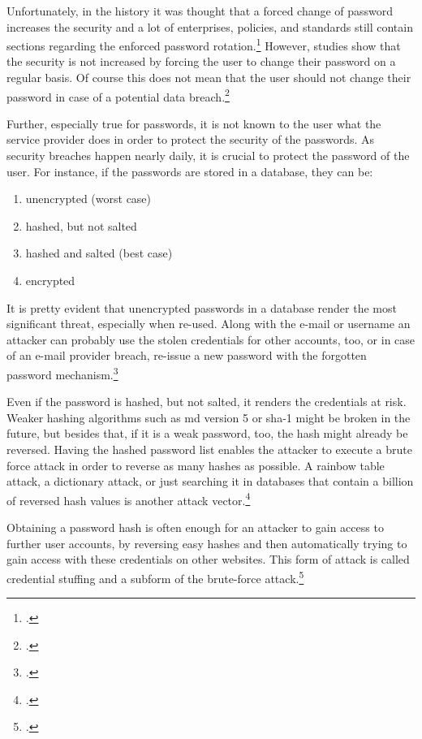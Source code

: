Unfortunately, in the history it was thought that a forced change of password increases the security and a lot of enterprises, policies, and standards still contain sections regarding the enforced password rotation.\footcites[See][1520]{deutschlandgrundschutz} However, studies show that the security is not increased by forcing the user to change their password on a regular basis. Of course this does not mean that the user should not change their password in case of a potential data breach.\footcites[See][14]{SP80063B}[See][]{7676198}[See][34]{anderson2008security}

Further, especially true for passwords, it is not known to the user what the service provider does in order to protect the security of the passwords. As security breaches happen nearly daily, it is crucial to protect the password of the user. For instance, if the passwords are stored in a database, they can be:

\begin{enumerate}[label=(\alph*)]
	\item unencrypted (worst case)
	\item hashed, but not salted
	\item hashed and salted (best case)
	\item encrypted
\end{enumerate}

It is pretty evident that unencrypted passwords in a database render the most significant threat, especially when re-used. Along with the e-mail or username an attacker can probably use the stolen credentials for other accounts, too, or in case of an e-mail provider breach, re-issue a new password with the \frqq forgotten password\flqq{} mechanism.\footcite[See][277]{shostack2014threat}

Even if the password is hashed, but not salted, it renders the credentials at risk. Weaker hashing algorithms such as \gls{md} version 5 or \gls{sha}-1 might be broken in the future, but besides that, if it is a weak password, too, the hash might already be reversed. Having the hashed password list enables the attacker to execute a brute force attack in order to reverse as many hashes as possible. A rainbow table attack, a dictionary attack, or just searching it in databases that contain a billion of reversed hash values is another attack vector.\footcites[See][1425]{Thomas:2017:DBP:3133956.3134067}[See][427--430]{320284}[See][56--57]{anderson2008security}

Obtaining a password hash is often enough for an attacker to gain access to further user accounts, by reversing easy hashes and then automatically trying to gain access with these credentials on other websites. This form of attack is called \frqq credential stuffing\flqq{} and a subform of the brute-force attack.\footcites[See][]{troy-hunt-1}[See][1565]{48399}

